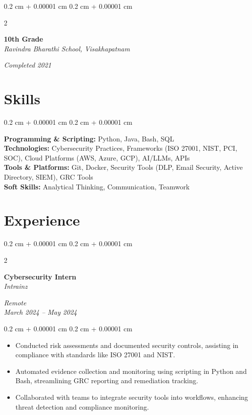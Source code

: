 \documentclass[10pt, letterpaper]{article}
\newenvironment{highlights}{
    \begin{itemize}[
        topsep=0.10 cm,
        parsep=0.10 cm,
        partopsep=0pt,
        itemsep=0pt,
        leftmargin=0.4 cm + 10pt
    ]
}{
    \end{itemize}
} %
\newenvironment{onecolentry}{
    \begin{adjustwidth}{
        0.2 cm + 0.00001 cm
    }{
        0.2 cm + 0.00001 cm
    }
}{
    \end{adjustwidth}
} %
\newenvironment{twocolentry}[2][]{
    \onecolentry
    \def\secondColumn{#2}
    \setcolumnwidth{\fill, 4.5 cm}
    \begin{paracol}{2}
}{
    \switchcolumn \raggedleft \secondColumn
    \end{paracol}
    \endonecolentry
} %
\begin{document}
    \vspace{0.10 cm}
    \begin{twocolentry}{
        \textit{Completed 2021}
    }
        \textbf{10th Grade} \\
        \textit{Ravindra Bharathi School, Visakhapatnam}
    \end{twocolentry}

    \section{Skills}
    \begin{onecolentry}
        \textbf{Programming \& Scripting:} Python, Java, Bash, SQL \\
        \textbf{Technologies:} Cybersecurity Practices, Frameworks (ISO 27001, NIST, PCI, SOC), Cloud Platforms (AWS, Azure, GCP), AI/LLMs, APIs \\
        \textbf{Tools \& Platforms:} Git, Docker, Security Tools (DLP, Email Security, Active Directory, SIEM), GRC Tools \\
        \textbf{Soft Skills:} Analytical Thinking, Communication, Teamwork
    \end{onecolentry}

    \section{Experience}
    \begin{twocolentry}{
        \textit{Remote} \\
        \textit{March 2024 – May 2024}
    }
        \textbf{Cybersecurity Intern} \\
        \textit{Intrainz}
    \end{twocolentry}
    \vspace{0.10 cm}
    \begin{onecolentry}
        \begin{highlights}
            \item Conducted risk assessments and documented security controls, assisting in compliance with standards like ISO 27001 and NIST.
            \item Automated evidence collection and monitoring using scripting in Python and Bash, streamlining GRC reporting and remediation tracking.
            \item Collaborated with teams to integrate security tools into workflows, enhancing threat detection and compliance monitoring.
        \end{highlights}
    \end{onecolentry}
\end{document}
